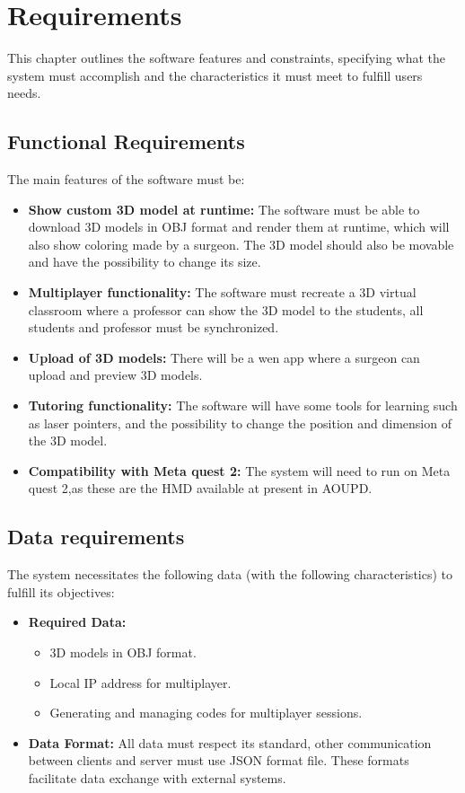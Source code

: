
\chapter{Requirements}
\label{chp:Requirements}
\noindent
This chapter outlines the software features and constraints, specifying what the system must accomplish and the characteristics it must meet to fulfill users needs.

\section{Functional Requirements}
\noindent
The main features of the software must be:

\begin{itemize}
  \item \textbf{Show custom 3D model at runtime:} The software must be able to download 3D models in OBJ format and render them at runtime, which will also show coloring made by a surgeon. The 3D model should also be movable and have the possibility to change its size. 
  \item \textbf{Multiplayer functionality:} The software must recreate a 3D virtual classroom where a professor can show the 3D model to the students, all students and professor must be synchronized.
  \item \textbf{Upload of 3D models:} There will be a wen app where a surgeon can upload and preview 3D models.
  \item \textbf{Tutoring functionality:} The software will have some tools for learning such as laser pointers, and the possibility to change the position and dimension of the 3D model.
  \item \textbf{Compatibility with Meta quest 2:} The system will need to run on Meta quest 2,as these are the HMD available at present in \ac{AOUPD}.
\end{itemize}
\section{Data requirements}
\noindent
The system necessitates the following data (with the following characteristics) to fulfill its objectives:

\begin{itemize}
  \item \textbf{Required Data:} 
  \begin{itemize}
    \item 3D models in OBJ format.
    \item Local \ac{IP} address for multiplayer.
    \item Generating and managing codes for multiplayer sessions.
  \end{itemize}
  \item \textbf{Data Format:} All data must respect its standard, other communication between clients and server must use \ac{JSON} format file. These formats facilitate data exchange with external systems.
\end{itemize}

